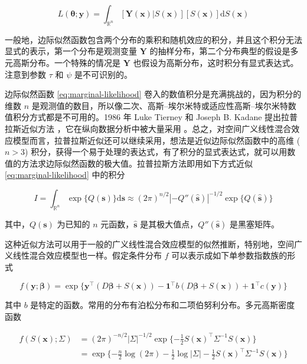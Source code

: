 \documentclass[12pt,a4paper,UTF8,twoside]{book}
\theoremstyle{definition}
\theoremstyle{definition}
\theoremstyle{definition}
\theoremstyle{remark}
\begin{document}
\begin{equation}
L(\boldsymbol{\theta};\mathbf{y}) = \int_{\mathbb{R}^n} [\mathbf{Y(x)}|S(\mathbf{x})][S(\mathbf{x})]\mathrm{d}S(\mathbf{x}) \label{eq:marginal-likelihood}
\end{equation}

一般地，边际似然函数包含两个分布的乘积和随机效应的积分，并且这个积分无法显式的表示，第一个分布是观测变量
\(\mathbf{Y}\)
的抽样分布，第二个分布典型的假设是多元高斯分布。一个特殊的情况是
\(\mathbf{Y}\) 也假设为高斯分布，这时积分有显式表达式。注意到参数
\(\tau\) 和 \(\psi\) 是不可识别的。

边际似然函数 \eqref{eq:marginal-likelihood}
卷入的数值积分是充满挑战的，因为积分的维数 \(n\)
是观测值的数目，所以像二次、高斯--埃尔米特或适应性高斯--埃尔米特数值积分方式都是不可用的。1986
年 Luke Tierney 和 Joseph B. Kadane 提出拉普拉斯近似方法
\citep{Tierney1986}，它在纵向数据分析中被大量采用
\citep{Diggle2002Analysis}。总之，对空间广义线性混合效应模型而言，拉普拉斯近似还可以继续采用，想法是近似边际似然函数中的高维
(\(n > 3\))
积分，获得一个易于处理的表达式，有了积分的显式表达式，就可以用数值的方法求边际似然函数的极大值。拉普拉斯方法即用如下方式近似
\eqref{eq:marginal-likelihood} 中的积分

\begin{equation}
I   =  \int_{\mathbb{R}^n} \exp\{Q(\mathbf{s})\}\mathrm{d}\mathbf{s} 
  \approx  (2\pi)^{n/2} |-Q''(\hat{\mathbf{s}})|^{-1/2}\exp\{Q(\hat{\mathbf{s}})\} \label{eq:laplace-approximate}
\end{equation}

其中，\(Q(\mathbf{s})\) 为已知的 \(n\) 元函数，\(\hat{\mathbf{s}}\)
是其极大值点，\(Q''(\hat{\mathbf{s}})\) 是黑塞矩阵。

这种近似方法可以用于一般的广义线性混合效应模型的似然推断，特别地，空间广义线性混合效应模型也一样。假定条件分布
\(f\) 可以表示成如下单参数指数族的形式

\begin{equation}
f(\mathbf{y};\boldsymbol{\beta})  = \exp\{\mathbf{y}^{\top} (D\boldsymbol{\beta} + S(\mathbf{x})) - \mathbf{1}^{\top} b( D\boldsymbol{\beta} + S(\mathbf{x})) + \mathbf{1}^{\top} c(\mathbf{y}) \}  \label{eq:exponential-family}
\end{equation}

其中 \(b\)
是特定的函数。常用的分布有泊松分布和二项伯努利分布。多元高斯密度函数

\begin{align}
f(S(\mathbf{x});\Sigma) & = (2\pi)^{-n/2}|\Sigma|^{-1/2} \exp\{ -\frac{1}{2}S(\mathbf{x})^{\top} \Sigma^{-1} S(\mathbf{x}) \} \\
                      & = \exp\{ - \frac{n}{2}\log (2\pi) -\frac{1}{2}\log |\Sigma|  -\frac{1}{2}S(\mathbf{x})^{\top} \Sigma^{-1} S(\mathbf{x}) \} \label{eq:multi-gaussian-dist}
\end{align}
\end{document}

